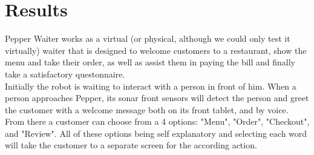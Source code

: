 \documentclass[12pt, letterpaper, twoside]{article}
\begin{document}
\newpage
\section{Results}
Pepper Waiter works as a virtual (or physical, although we could only test it virtually) waiter that is designed to welcome customers to a restaurant, show the menu and take their order, as well as assist them in paying the bill and finally take a satisfactory questonnaire. \\

Initially the robot is waiting to interact with a person in front of him. When a person approaches Pepper, its sonar front sensors will detect the person and greet the customer with a welcome message both on its front tablet, and by voice. From there a customer can choose from a 4 options: "Menu", "Order", "Checkout", and "Review". All of these options being self explanatory and selecting each word will take the customer to a separate screen for the according action.  \\
\end{document}
